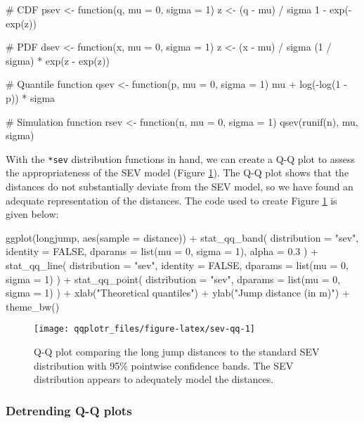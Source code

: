 \begin{Schunk}
\begin{Sinput}
# CDF
psev <- function(q, mu = 0, sigma = 1) {
    z <- (q - mu) / sigma
    1 - exp(-exp(z))
}

# PDF
dsev <- function(x, mu = 0, sigma = 1) {
  z <- (x - mu) / sigma
  (1 / sigma) * exp(z - exp(z))
}

# Quantile function
qsev <- function(p, mu = 0, sigma = 1) {
  mu + log(-log(1 - p)) * sigma
}

# Simulation function
rsev <- function(n, mu = 0, sigma = 1) {
  qsev(runif(n), mu, sigma)
}
\end{Sinput}
\end{Schunk}

With the \texttt{*sev} distribution functions in hand, we can create a
Q-Q plot to assess the appropriateness of the SEV model (Figure
\ref{fig:sev-qq}). The Q-Q plot shows that the distances do not
substantially deviate from the SEV model, so we have found an adequate
representation of the distances. The code used to create Figure
\ref{fig:sev-qq} is given below:

\begin{Schunk}
\begin{Sinput}
ggplot(longjump, aes(sample = distance)) +
  stat_qq_band(
    distribution = "sev", 
    identity = FALSE,
    dparams = list(mu = 0, sigma = 1), 
    alpha = 0.3
    ) +
  stat_qq_line(
    distribution = "sev", 
    identity = FALSE,
    dparams = list(mu = 0, sigma = 1)
    ) +
  stat_qq_point(
    distribution = "sev", 
    dparams = list(mu = 0, sigma = 1)
    ) +
  xlab("Theoretical quantiles") +
  ylab("Jump distance (in m)") +
  theme_bw()
\end{Sinput}
\begin{figure}

{\centering \texttt{[image: qqplotr\_files/figure-latex/sev-qq-1]} 

}

\caption[Q-Q plot comparing the long jump distances to the standard SEV distribution with 95\% pointwise confidence bands]{Q-Q plot comparing the long jump distances to the standard SEV distribution with 95\% pointwise confidence bands. The SEV distribution appears to adequately model the distances.}\label{fig:sev-qq}
\end{figure}
\end{Schunk}

\subsubsection{Detrending Q-Q plots}\label{detrending-q-q-plots}

